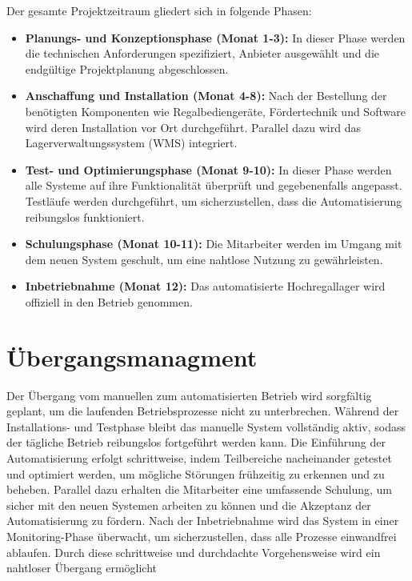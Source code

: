 Der gesamte Projektzeitraum gliedert sich in folgende Phasen:

\begin{itemize}
\item \textbf{Planungs- und Konzeptionsphase (Monat 1-3):}
In dieser Phase werden die technischen Anforderungen spezifiziert, Anbieter ausgewählt und die endgültige Projektplanung abgeschlossen.
\item \textbf{Anschaffung und Installation (Monat 4-8):}
Nach der Bestellung der benötigten Komponenten wie Regalbediengeräte, Fördertechnik und Software wird deren Installation vor Ort durchgeführt. Parallel dazu wird das Lagerverwaltungssystem (WMS) integriert.
\item \textbf{Test- und Optimierungsphase (Monat 9-10):}
In dieser Phase werden alle Systeme auf ihre Funktionalität überprüft und gegebenenfalls angepasst. Testläufe werden durchgeführt, um sicherzustellen, dass die Automatisierung reibungslos funktioniert.
\item \textbf{Schulungsphase (Monat 10-11):}
Die Mitarbeiter werden im Umgang mit dem neuen System geschult, um eine nahtlose Nutzung zu gewährleisten.
\item \textbf{Inbetriebnahme (Monat 12):}
Das automatisierte Hochregallager wird offiziell in den Betrieb genommen.
\end{itemize}

\section{Übergangsmanagment}

Der Übergang vom manuellen zum automatisierten Betrieb wird sorgfältig geplant, um die laufenden Betriebsprozesse nicht zu unterbrechen. Während der Installations- und Testphase bleibt das manuelle System vollständig aktiv, sodass der tägliche Betrieb reibungslos fortgeführt werden kann. Die Einführung der Automatisierung erfolgt schrittweise, indem Teilbereiche nacheinander getestet und optimiert werden, um mögliche Störungen frühzeitig zu erkennen und zu beheben. Parallel dazu erhalten die Mitarbeiter eine umfassende Schulung, um sicher mit den neuen Systemen arbeiten zu können und die Akzeptanz der Automatisierung zu fördern. Nach der Inbetriebnahme wird das System in einer Monitoring-Phase überwacht, um sicherzustellen, dass alle Prozesse einwandfrei ablaufen. Durch diese schrittweise und durchdachte Vorgehensweise wird ein nahtloser Übergang ermöglicht